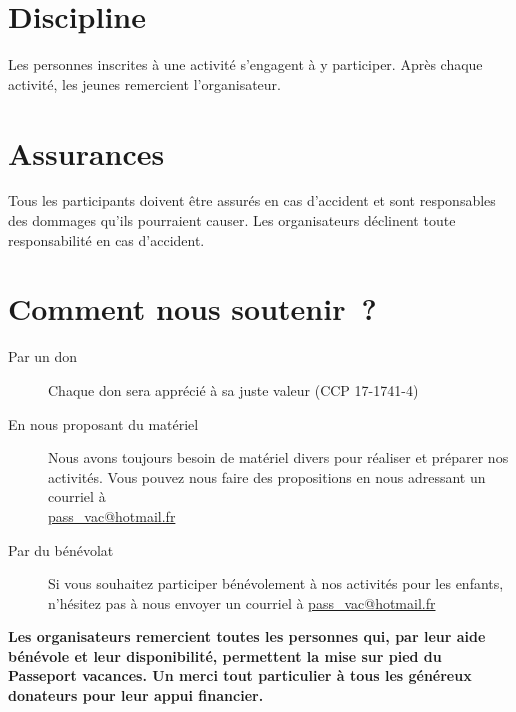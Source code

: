\section*{Discipline}

Les personnes inscrites à une activité s'engagent à y participer. Après chaque activité, les jeunes remercient l'organisateur.

\section*{Assurances}

Tous les participants doivent être assurés en cas d'accident et sont responsables des dommages qu'ils pourraient causer. Les organisateurs déclinent toute responsabilité en cas d'accident.

\section*{Comment nous soutenir ?}

\begin{description}
	\item [Par un don]
	Chaque don sera apprécié à sa juste valeur (CCP 17-1741-4)
	\item [En nous proposant du matériel]
	Nous avons toujours besoin de matériel divers pour réaliser et préparer
	nos activités. Vous pouvez nous faire des propositions en nous adressant
	un courriel à\\
	\url{pass\_vac@hotmail.fr}
	\item [Par du bénévolat]
	Si vous souhaitez participer bénévolement à nos activités pour les
	enfants, n’hésitez pas à nous envoyer un courriel à \url{pass_vac@hotmail.fr}
\end{description}

\textbf{Les organisateurs remercient toutes les personnes qui, par leur aide bénévole et leur disponibilité, permettent la mise sur pied du Passeport vacances. Un merci tout particulier à tous les généreux donateurs pour leur appui financier.
}
